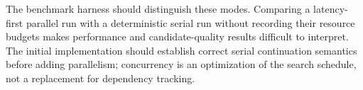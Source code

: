The benchmark harness should distinguish these modes. Comparing a latency-first parallel run with a deterministic serial run without recording their resource budgets makes performance and candidate-quality results difficult to interpret. The initial implementation should establish correct serial continuation semantics before adding parallelism; concurrency is an optimization of the search schedule, not a replacement for dependency tracking.
